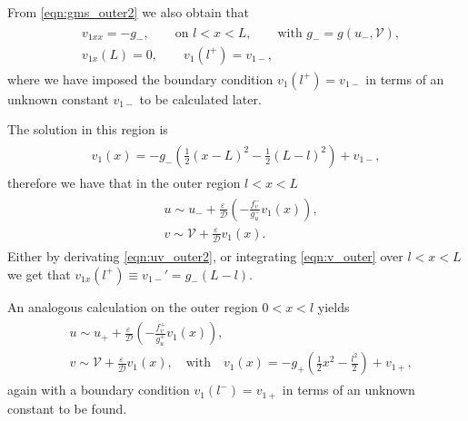 \documentclass[a4paper,10pt]{article}
\newcommand{\Ep}{\ensuremath{\varepsilon\,}}
\newcommand{\DD}{\ensuremath{\mathcal{D}}}
\newcommand{\VV}{\ensuremath{\mathcal{V}}}
\begin{document}
From \eqref{eqn:gms_outer2} we also obtain that
% 
\begin{equation}
\label{eqn:v_outer}
\begin{split}
\begin{aligned}
	&v_{1xx} = -g_-,\qquad\text{on }l<x<L,\qquad\text{with }g_- = g(u_-,\VV),\\
	&v_{1x}(L) = 0,\qquad v_1(l^+)=v_{1-},
\end{aligned}
\end{split}
\end{equation}
%
where we have imposed the boundary condition $v_1(l^+) = v_{1-}$ in terms of an unknown constant $v_{1-}$ to be calculated later.

The solution in this region is
% 
\begin{equation}
\label{eqn:v1}
\begin{split}
\begin{aligned}
	v_1(x) = -g_-\left(\frac{1}{2}(x-L)^2-\frac{1}{2}(L-l)^2\right) + v_{1-},
\end{aligned}
\end{split}
\end{equation}
%
therefore we have that in the outer region $l<x<L$ 
% 
\begin{equation}
\label{eqn:uv_outer2}
\begin{split}
\begin{aligned}
	&u\sim u_- + \frac{\Ep}{\DD}\left(-\frac{f_v^-}{g_u^-}v_1(x) \right),\\
	&v\sim \VV + \frac{\Ep}{\DD}v_1(x).
\end{aligned}
\end{split}
\end{equation}
%
Either by derivating \eqref{eqn:uv_outer2}, or integrating \eqref{eqn:v_outer} over $l<x<L$ we get that $v_{1x}(l^+)\equiv v_{1-}' = g_-(L-l)$.

An analogous calculation on the outer region $0<x<l$ yields 
% 
\begin{equation*}
\begin{split}
\begin{aligned}
	&u\sim u_+ + \frac{\Ep}{\DD}\left(-\frac{f_v^+}{g_u^+}v_1(x) \right),\\
	&v\sim \VV + \frac{\Ep}{\DD}v_1(x),\quad\text{with}\quad v_1(x) = -g_+\left(\frac{1}{2}x^2-\frac{l^2}{2} \right) + v_{1+},
\end{aligned}
\end{split}
\end{equation*}
%
again with a boundary condition $v_1(l^-)=v_{1+}$ in terms of an unknown constant to be found. 
\end{document}
